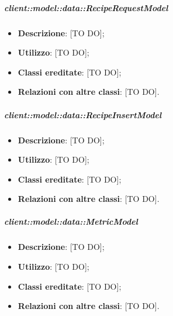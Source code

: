 \begin{itemize}
		\subparagraph{client::model::data::RecipeRequestModel} %
		\label{subp:client_model_data_reciperequestmodel}
			\begin{itemize}
				\item \textbf{Descrizione}: [TO DO];
				\item \textbf{Utilizzo}: [TO DO];
				\item \textbf{Classi ereditate}: [TO DO];
				\item \textbf{Relazioni con altre classi}: [TO DO].
			\end{itemize}

		\subparagraph{client::model::data::RecipeInsertModel} %
		\label{subp:client_model_data_recipeinsertmodel}
			\begin{itemize}
				\item \textbf{Descrizione}: [TO DO];
				\item \textbf{Utilizzo}: [TO DO];
				\item \textbf{Classi ereditate}: [TO DO];
				\item \textbf{Relazioni con altre classi}: [TO DO].
			\end{itemize}

		\subparagraph{client::model::data::MetricModel} %
		\label{subp:client_model_data_metricmodel}
			\begin{itemize}
				\item \textbf{Descrizione}: [TO DO];
				\item \textbf{Utilizzo}: [TO DO];
				\item \textbf{Classi ereditate}: [TO DO];
				\item \textbf{Relazioni con altre classi}: [TO DO].
			\end{itemize}


\end{itemize}
